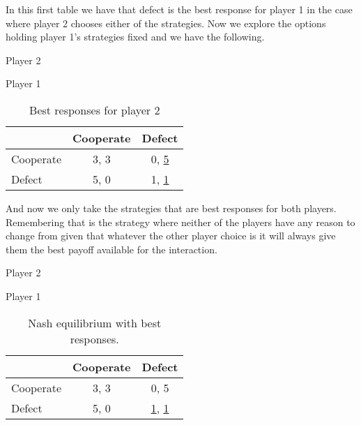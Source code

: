 \documentclass{book}
\begin{document}
In this first table we have that defect is the best response for player 1 in the case where player 2 chooses either of the strategies. 
Now we explore the options holding player 1's strategies fixed and we have the following.

\begin{table}[h]
\begin{center}
Player 2

Player 1
\begin{tabular}{|l|c|c|}
\hline
 & Cooperate & Defect\\ 
\hline
Cooperate & 3, 3 & 0, \underline{5}\\
\hline
Defect & 5, 0 & 1, \underline{1}\\
\hline
\end{tabular}
\caption{ Best responses for player 2}
\label{tab:normformbr2}
\end{center}
\end{table}

And now we only take the strategies that are best responses for both players. Remembering that is the strategy where neither of the players have any reason to change from given that whatever the other player choice is it will always give them the best payoff available for the interaction.
 \begin{table}[h]
\begin{center}
Player 2

Player 1
\begin{tabular}{|l|c|c|}
\hline
 & Cooperate & Defect\\ 
\hline
Cooperate & 3, 3 & 0, 5\\
\hline
Defect & 5, 0 & \underline{1}, \underline{1}\\
\hline
\end{tabular}
\caption{ Nash equilibrium with best responses.}
\label{tab:normformbr3}
\end{center}
\end{table}
\end{document}

